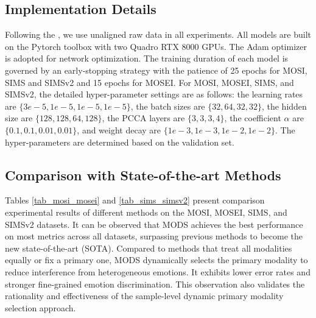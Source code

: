 \documentclass[letterpaper]{article} %
\begin{document}
\subsection{Implementation Details}
Following the \cite{yu2021learning}, we use unaligned raw data in all experiments. All models are built on the Pytorch toolbox \cite{paszke2019pytorch} with two Quadro RTX 8000 GPUs. The Adam optimizer~\cite{kingma2014adam} is adopted for network optimization. The training duration of each model is governed by an early-stopping strategy with the patience of 25 epochs for MOSI, SIMS and SIMSv2 and 15 epochs for MOSEI. 
For MOSI, MOSEI, SIMS, and SIMSv2, the detailed hyper-parameter settings are as follows: the learning rates are $\{3e-5, 1e-5, 1e-5,1e-5\}$, the batch sizes are $\{32, 64, 32, 32\}$, the hidden size are $\{128, 128, 64, 128\}$, the PCCA layers are $\{3, 3, 3, 4\}$, the coefficient $\alpha$ are $\{0.1, 0.1, 0.01, 0.01\}$, and weight decay are $\{1e-3, 1e-3, 1e-2, 1e-2\}$.
The hyper-parameters are determined based on the validation set.



\subsection{Comparison with State-of-the-art Methods}
Tables \ref{tab_mosi_mosei} and \ref{tab_sims_simsv2} present comparison experimental results of different methods on the MOSI, MOSEI, SIMS, and SIMSv2 datasets. It can be observed that MODS achieves the best performance on most metrics across all datasets, surpassing previous methods to become the new state-of-the-art (SOTA).  Compared to methods that treat all modalities equally or fix a primary one, MODS dynamically selects the primary modality to reduce interference from heterogeneous emotions. It exhibits lower error rates and stronger fine-grained emotion discrimination. This observation also validates the rationality and effectiveness of the sample-level dynamic primary modality selection approach. 
\end{document}
